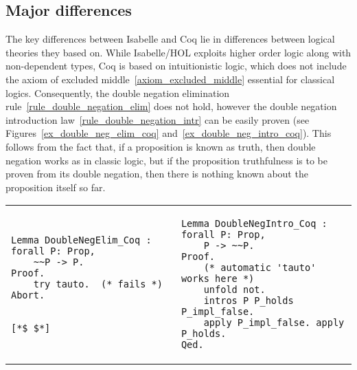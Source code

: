 \documentclass[article]{aaltoseries}
\begin{document}

\subsection{Major differences}

The key differences between Isabelle and Coq lie in differences between logical theories they based on. While Isabelle/HOL exploits higher order logic along with non-dependent types, Coq is based on intuitionistic logic, which does not include the axiom of excluded middle~\eqref{axiom_excluded_middle} essential for classical logics.
Consequently, the double negation elimination rule~\eqref{rule_double_negation_elim} does not hold, however the double negation introduction law~\eqref{rule_double_negation_intr} can be easily proven (see Figures~\ref{ex_double_neg_elim_coq} and~\ref{ex_double_neg_intro_coq}). This follows from the fact that, if a proposition is known as truth, then double negation works as in classic logic, but if the proposition truthfulness is to be proven from its double negation, then there is nothing known about the proposition itself so far.

\begin{raggedleft}
\begin{tabular}{p{.45\linewidth} p{.45\linewidth}}
\begin{lstlisting}[language=coq,
    caption={Proof failure of the \eqref{rule_double_negation_elim} rule in Coq},
    label=ex_double_neg_elim_coq]
Lemma DoubleNegElim_Coq : forall P: Prop,
    ~~P -> P.
Proof.
    try tauto.  (* fails *)
Abort.


[*$ $*]
\end{lstlisting} %
&
\begin{lstlisting}[language=coq,
    caption={Proof of the \eqref{rule_double_negation_elim} rule in Coq},
    label=ex_double_neg_intro_coq]
Lemma DoubleNegIntro_Coq : forall P: Prop,
    P -> ~~P.
Proof.
    (* automatic 'tauto' works here *)
    unfold not.
    intros P P_holds P_impl_false.
    apply P_impl_false. apply P_holds. 
Qed.
\end{lstlisting}
\end{tabular}
\end{raggedleft}
\end{document}
